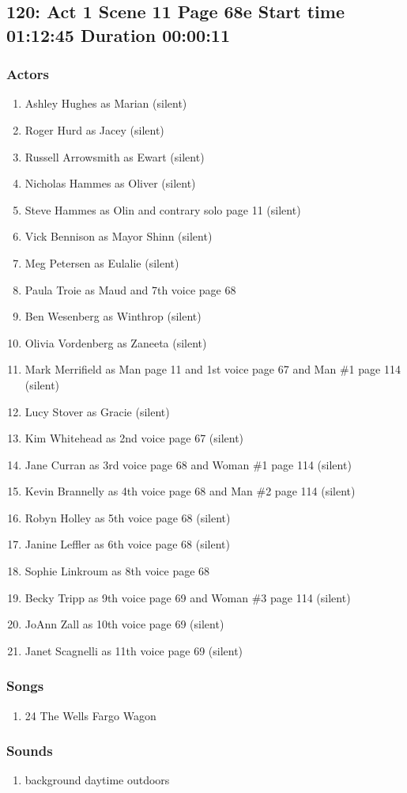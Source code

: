 \subsection{120: Act 1 Scene 11 Page 68e Start time 01:12:45 Duration 00:00:11}

\subsubsection{Actors}
\begin{enumerate}
\item Ashley Hughes as Marian (silent)
\item Roger Hurd as Jacey (silent)
\item Russell Arrowsmith as Ewart (silent)
\item Nicholas Hammes as Oliver (silent)
\item Steve Hammes as Olin and contrary solo page 11 (silent)
\item Vick Bennison as Mayor Shinn (silent)
\item Meg Petersen as Eulalie (silent)
\item Paula Troie as Maud and 7th voice page 68
\item Ben Wesenberg as Winthrop (silent)
\item Olivia Vordenberg as Zaneeta (silent)
\item Mark Merrifield as Man page 11 and 1st voice page 67 and Man \#1 page 114 (silent)
\item Lucy Stover as Gracie (silent)
\item Kim Whitehead as 2nd voice page 67 (silent)
\item Jane Curran as 3rd voice page 68 and Woman \#1 page 114 (silent)
\item Kevin Brannelly as 4th voice page 68 and Man \#2 page 114 (silent)
\item Robyn Holley as 5th voice page 68 (silent)
\item Janine Leffler as 6th voice page 68 (silent)
\item Sophie Linkroum as 8th voice page 68
\item Becky Tripp as 9th voice page 69 and Woman \#3 page 114 (silent)
\item JoAnn Zall as 10th voice page 69 (silent)
\item Janet Scagnelli as 11th voice page 69 (silent)
\end{enumerate}

\subsubsection{Songs}
\begin{enumerate}
\item 24 The Wells Fargo Wagon
\end{enumerate}\subsubsection{Sounds}
\begin{enumerate}
\item background daytime outdoors
\end{enumerate}
